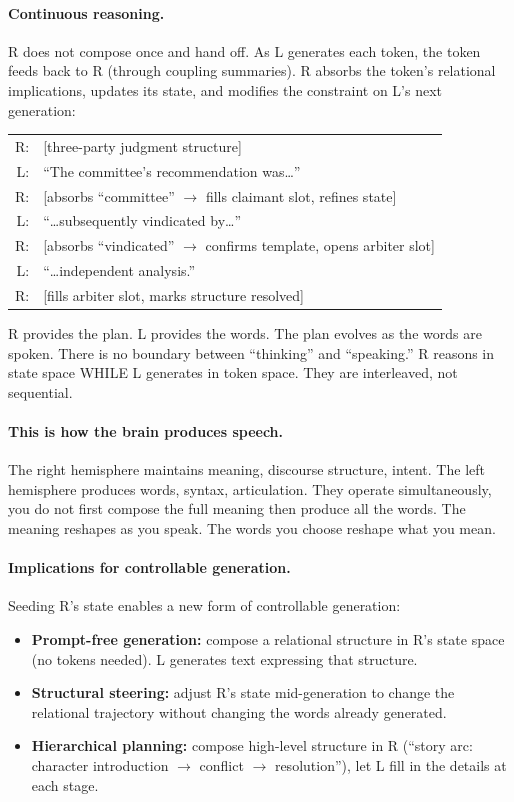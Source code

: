 \documentclass[11pt, a4paper]{article}
\theoremstyle{plain}
\theoremstyle{definition}
\theoremstyle{remark}
\begin{document}
\paragraph{Continuous reasoning.}
R does not compose once and hand off.
As L generates each token, the token feeds back to R (through coupling summaries).
R absorbs the token's relational implications, updates its state, and modifies the constraint on L's next generation:

\begin{center}\small
\begin{tabular}{rl}
R: & [three-party judgment structure] \\
L: & ``The committee's recommendation was\ldots'' \\
R: & [absorbs ``committee'' $\to$ fills claimant slot, refines state] \\
L: & ``\ldots subsequently vindicated by\ldots'' \\
R: & [absorbs ``vindicated'' $\to$ confirms template, opens arbiter slot] \\
L: & ``\ldots independent analysis.'' \\
R: & [fills arbiter slot, marks structure resolved] \\
\end{tabular}
\end{center}

R provides the plan. L provides the words.
The plan evolves as the words are spoken.
There is no boundary between ``thinking'' and ``speaking.''
R reasons in state space WHILE L generates in token space.
They are interleaved, not sequential.

\paragraph{This is how the brain produces speech.}
The right hemisphere maintains meaning, discourse structure, intent.
The left hemisphere produces words, syntax, articulation.
They operate simultaneously, you do not first compose the full meaning then produce all the words.
The meaning reshapes as you speak.
The words you choose reshape what you mean.

\paragraph{Implications for controllable generation.}
Seeding R's state enables a new form of controllable generation:
\begin{itemize}[nosep]
\item \textbf{Prompt-free generation:} compose a relational structure in R's state space (no tokens needed). L generates text expressing that structure.
\item \textbf{Structural steering:} adjust R's state mid-generation to change the relational trajectory without changing the words already generated.
\item \textbf{Hierarchical planning:} compose high-level structure in R (``story arc: character introduction $\to$ conflict $\to$ resolution''), let L fill in the details at each stage.
\end{itemize}
\end{document}
